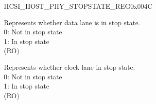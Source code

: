 \begin{register}{H}{CSI\_HOST\_PHY\_STOPSTATE\_REG}{0x004C}\label{regdesc:CSIHOSTPHYSTOPSTATEREG}
%
%
%
%
%
\regnewline%
\begin{regdesc}\begin{reglist}
\label{fielddesc:CSIHOSTPHYSTOPSTATEDATA0}\item [CSI\_HOST\_PHY\_STOPSTATEDATA\_\regindex{n} (\regindex{n}: 0-1)] Represents whether data lane  is in stop state. \\
0: Not in stop state\\
1: In stop state\\
(RO)
\label{fielddesc:CSIHOSTPHYSTOPSTATECLK}\item [CSI\_HOST\_PHY\_STOPSTATECLK] Represents whether clock lane in stop state.\\ 
0: Not in stop state\\
1: In stop state\\
(RO)
\end{reglist}\end{regdesc}
\end{register}

